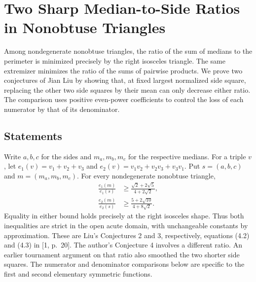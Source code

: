 \documentclass[11pt,a4paper]{article}
\numberwithin{equation}{section}
\theoremstyle{definition}
\theoremstyle{remark}
\newenvironment{sectionabstract}{\par\smallskip\begingroup\small\noindent}{\par\endgroup\medskip}
\begin{document}
\par\endgroup

\begingroup
\newcommand{\eone}{e_1}
\newcommand{\etwo}{e_2}
\section{\texorpdfstring{Two Sharp Median-to-Side Ratios in Nonobtuse Triangles}{Two Sharp Median-to-Side Ratios in Nonobtuse Triangles}}\label{section:r31showa}
\par\medskip


\begin{sectionabstract}
Among nondegenerate nonobtuse triangles, the ratio of the sum of
medians to the perimeter is minimized precisely by the right
isosceles triangle. The same extremizer minimizes the ratio of the
sums of pairwise products. We prove two conjectures of Jian Liu by
showing that, at fixed largest normalized side square, replacing the
other two side squares by their mean can only decrease either ratio.
The comparison uses positive even-power coefficients to control the
loss of each numerator by that of its denominator.
\end{sectionabstract}

\subsection*{Statements}
Write $a,b,c$ for the sides and $m_a,m_b,m_c$ for the respective
medians. For a triple $v$, let $e_1(v)=v_1+v_2+v_3$ and
$e_2(v)=v_1v_2+v_2v_3+v_3v_1$. Put $s=(a,b,c)$ and
$m=(m_a,m_b,m_c)$. For every nondegenerate nonobtuse triangle,
\begin{align}
 \frac{e_1(m)}{e_1(s)}&\geq \frac{\sqrt2+2\sqrt5}{4+2\sqrt2},
 \label{r31showa:one}\\
 \frac{e_2(m)}{e_2(s)}&\geq \frac{5+2\sqrt{10}}{4+8\sqrt2}.
 \label{r31showa:two}
\end{align}
Equality in either bound holds precisely at the right isosceles shape.
Thus both inequalities are strict in the open acute domain, with
unchangeable constants by approximation. These are Liu's Conjectures
2 and 3, respectively, equations (4.2) and (4.3) in [1, p.~20].
The author's Conjecture 4 involves a different ratio. An earlier
tournament argument on that ratio also smoothed the two shorter side
squares. The numerator and denominator comparisons below are specific
to the first and second elementary symmetric functions.
\end{document}
